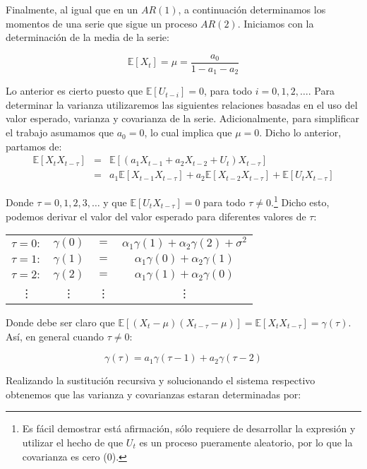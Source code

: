 \documentclass[
  a4paper,
]{article}
\begin{document}
Finalmente, al igual que en un \(AR(1)\), a continuación determinamos
los momentos de una serie que sigue un proceso \(AR(2)\). Iniciamos con
la determinación de la media de la serie:

\[
\mathbb{E}[X_t] = \mu = \frac{a_0}{1 - a_1 - a_2}
\]

Lo anterior es cierto puesto que \(\mathbb{E}[U_{t - i}] = 0\), para
todo \(i = 0, 1, 2, \ldots\). Para determinar la varianza utilizaremos
las siguientes relaciones basadas en el uso del valor esperado, varianza
y covarianza de la serie. Adicionalmente, para simplificar el trabajo
asumamos que \(a_0 = 0\), lo cual implica que \(\mu = 0\). Dicho lo
anterior, partamos de: \begin{eqnarray*}
    \mathbb{E}[X_t X_{t - \tau}] & = & \mathbb{E}[(a_1 X_{t-1} + a_2 X_{t-2} + U_t) X_{t - \tau}]\\
    & = & a_1 \mathbb{E}[X_{t - 1} X_{t - \tau}] + a_2 \mathbb{E}[X_{t - 2} X_{t - \tau}] + \mathbb{E}[U_{t} X_{t - \tau}]
\end{eqnarray*}

Donde \(\tau = 0, 1, 2, 3, \ldots\) y que
\(\mathbb{E}[U_{t} X_{t - \tau}] = 0\) para todo
\(\tau \neq 0\).\footnote{ Es fácil demostrar está afirmación, sólo requiere de desarrollar la expresión y utilizar el hecho de que $U_t$ es un proceso pueramente aleatorio, por lo que la covarianza es cero (0).}
Dicho esto, podemos derivar el valor del valor esperado para diferentes
valores de \(\tau\):

\begin{center}
\begin{tabular}{ c c c c } 
    $\tau = 0:$ & $\gamma(0)$ & $=$ & $\alpha_1 \gamma(1) + \alpha_2 \gamma(2) + \sigma^2$ \\
    $\tau = 1:$ & $\gamma(1)$ & $=$ & $\alpha_1 \gamma(0) + \alpha_2 \gamma(1)$ \\
    $\tau = 2:$ & $\gamma(2)$ & $=$ & $\alpha_1 \gamma(1) + \alpha_2 \gamma(0)$ \\
    \vdots & \vdots & \vdots & \vdots
\end{tabular}
\end{center}

Donde debe ser claro que
\(\mathbb{E}[(X_{t} - \mu)(X_{t - \tau} - \mu)] = \mathbb{E}[X_{t} X_{t - \tau}] = \gamma(\tau)\).
Así, en general cuando \(\tau \neq 0\):

\[
\gamma(\tau) = a_1 \gamma(\tau - 1) + a_2 \gamma(\tau - 2)
\]

Realizando la sustitución recursiva y solucionando el sistema respectivo
obtenemos que las varianza y covarianzas estaran determinadas por:
\end{document}
